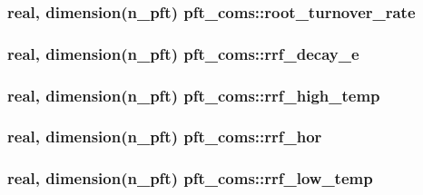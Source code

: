 \subsubsection[{\texorpdfstring{root\+\_\+turnover\+\_\+rate}{root_turnover_rate}}]{\setlength{\rightskip}{0pt plus 5cm}real, dimension(n\+\_\+pft) pft\+\_\+coms\+::root\+\_\+turnover\+\_\+rate}\hypertarget{namespacepft__coms_a99860b135721c9298c4a28c8eeaab425}{}\label{namespacepft__coms_a99860b135721c9298c4a28c8eeaab425}
\subsubsection[{\texorpdfstring{rrf\+\_\+decay\+\_\+e}{rrf_decay_e}}]{\setlength{\rightskip}{0pt plus 5cm}real, dimension(n\+\_\+pft) pft\+\_\+coms\+::rrf\+\_\+decay\+\_\+e}\hypertarget{namespacepft__coms_a2087ec09afb37705591b08017b2bcb27}{}\label{namespacepft__coms_a2087ec09afb37705591b08017b2bcb27}
\subsubsection[{\texorpdfstring{rrf\+\_\+high\+\_\+temp}{rrf_high_temp}}]{\setlength{\rightskip}{0pt plus 5cm}real, dimension(n\+\_\+pft) pft\+\_\+coms\+::rrf\+\_\+high\+\_\+temp}\hypertarget{namespacepft__coms_ae05300b2ffecef7671154f099c69e0bb}{}\label{namespacepft__coms_ae05300b2ffecef7671154f099c69e0bb}
\subsubsection[{\texorpdfstring{rrf\+\_\+hor}{rrf_hor}}]{\setlength{\rightskip}{0pt plus 5cm}real, dimension(n\+\_\+pft) pft\+\_\+coms\+::rrf\+\_\+hor}\hypertarget{namespacepft__coms_a5fc24fd1652202216904fe39f1a2f318}{}\label{namespacepft__coms_a5fc24fd1652202216904fe39f1a2f318}
\subsubsection[{\texorpdfstring{rrf\+\_\+low\+\_\+temp}{rrf_low_temp}}]{\setlength{\rightskip}{0pt plus 5cm}real, dimension(n\+\_\+pft) pft\+\_\+coms\+::rrf\+\_\+low\+\_\+temp}\hypertarget{namespacepft__coms_a87bba89213b158e2aed4dac23565b3d6}{}\label{namespacepft__coms_a87bba89213b158e2aed4dac23565b3d6}
